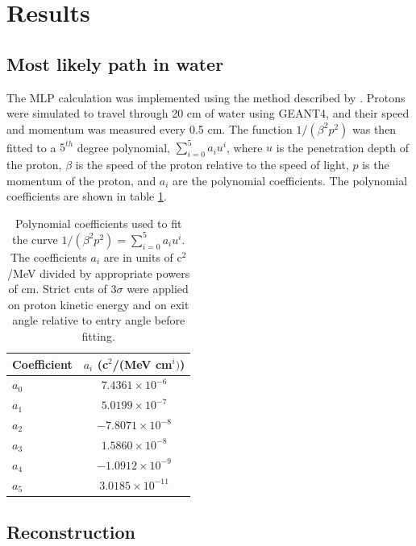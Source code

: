 \documentclass[11pt,a4paper]{article}
\begin{document}
\section{Results}



\subsection{Most likely path in water}
The MLP calculation was implemented using the method described by \cite{schulte2008maximum}. Protons were simulated to travel through 20 cm of water using GEANT4, and their speed and momentum was measured every 0.5 cm. The function $1/(\beta^2p^2)$ was then fitted to a $5^{th}$ degree polynomial, $\sum_{i=0}^{5} a_{i} u^{i}$, where $u$ is the penetration depth of the proton, $\beta$ is the speed of the proton relative to the speed of light, $p$ is the momentum of the proton, and $a_i$ are the polynomial coefficients. The polynomial coefficients are shown in table \ref{fig:coefficients}.

\begin{table}[h]
\centering
\caption{Polynomial coefficients used to fit the curve $1/(\beta^2 p^2) = \sum_{i=0}^5 a_i u^i$. The coefficients $a_{i}$ are in units of c$^2$/MeV divided by appropriate powers of cm. Strict cuts of $3\sigma$ were applied on proton kinetic energy and on exit angle relative to entry angle before fitting.}
\begin{tabular}{l|c}
\hline
Coefficient & $a_{i}$ (c$^2$/(MeV cm$^{i})$) \\ \hline
$a_0$ & $7.4361\times 10^{-6}$ \\
$a_1$ & $5.0199\times 10^{-7}$ \\
$a_2$ & $-7.8071 \times 10^{-8}$ \\ 
$a_3$ & $1.5860 \times 10^{-8}$ \\
$a_4$ & $-1.0912 \times 10^{-9}$ \\
$a_5$ & $3.0185 \times 10^{-11}$  \\
\end{tabular} 
\label{fig:coefficients}
\end{table}

\subsection{Reconstruction}
\end{document}
